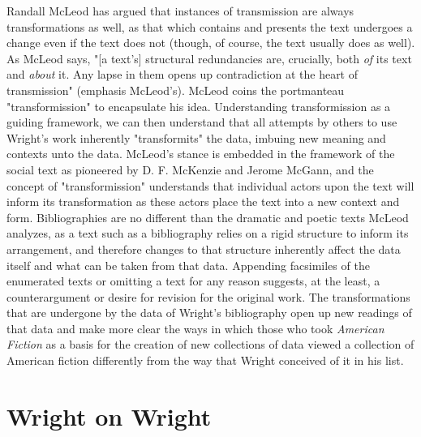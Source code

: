 Randall McLeod has argued that instances of transmission are always transformations as well, as that which contains and presents the text undergoes a change even if the text does not (though, of course, the text usually does as well). As McLeod says, "[a text's] structural redundancies are, crucially, both \textit{of} its text and \textit{about} it. Any lapse in them opens up contradiction at the heart of transmission" (emphasis McLeod's). McLeod coins the portmanteau "transformission" to encapsulate his idea.\autocite[246]{randall_mcleod_published_under_random_clod_information_1991}
Understanding transformission as a guiding framework, we can then understand that all attempts by others to use Wright's work inherently "transformits" the data, imbuing new meaning and contexts unto the data. McLeod's stance is embedded in the framework of the social text as pioneered by D. F. McKenzie and Jerome McGann, and the concept of "transformission" understands that individual actors upon the text will inform its transformation as these actors place the text into a new context and form. Bibliographies are no different than the dramatic and poetic texts McLeod analyzes, as a text such as a bibliography relies on a rigid structure to inform its arrangement, and therefore changes to that structure inherently affect the data itself and what can be taken from that data. Appending facsimiles of the enumerated texts or omitting a text for any reason suggests, at the least, a counterargument or desire for revision for the original work. The transformations that are undergone by the data of Wright's bibliography open up new readings of that data and make more clear the ways in which those who took \textit{American Fiction} as a basis for the creation of new collections of data viewed a collection of American fiction differently from the way that Wright conceived of it in his list. 


\section{Wright on Wright}

